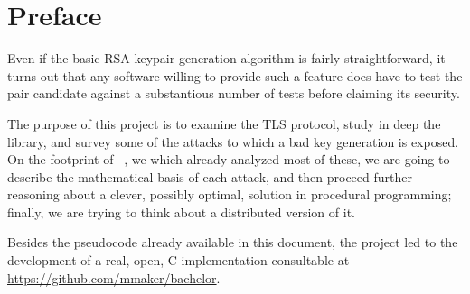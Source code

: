 \chapter{Preface}

Even if the basic RSA keypair generation algorithm is fairly
straightforward, it turns out that any software willing to provide such a
feature does have to test the pair candidate against a substantious number of
tests before claiming its security.

The purpose of this project is to examine the TLS protocol, study in deep the
\openssl library, and survey some of the attacks to which a bad key generation
is exposed. On the footprint of ~\cite{20years}, we which already analyzed most
of these, we are going to describe the mathematical basis of each attack, and
then proceed further reasoning about a clever, possibly optimal, solution in
procedural programming; finally, we are trying to think about a distributed
version of it.

Besides the pseudocode already available in this document, the project led to the
development of a real, open, C implementation consultable at
\small{\url{https://github.com/mmaker/bachelor}}.

